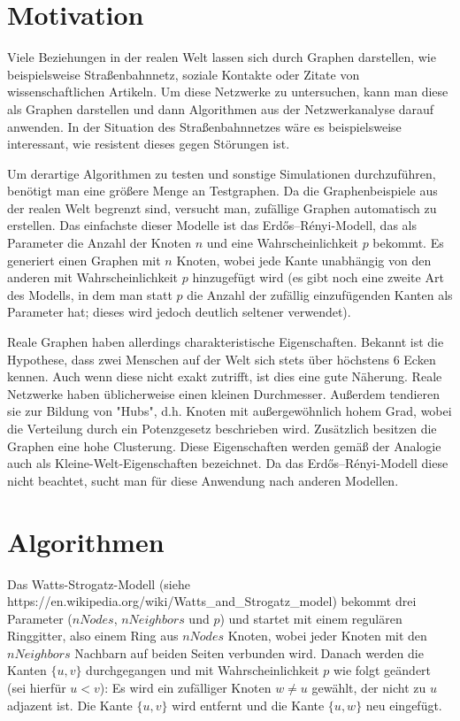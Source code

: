 \documentclass[a4paper]{scrartcl}
\begin{document}
\section{Motivation}
Viele Beziehungen in der realen Welt lassen sich durch Graphen darstellen, wie beispielsweise Straßenbahnnetz, soziale Kontakte oder Zitate von wissenschaftlichen Artikeln. Um diese Netzwerke zu untersuchen, kann man diese als Graphen darstellen und dann Algorithmen aus der Netzwerkanalyse darauf anwenden. In der Situation des Straßenbahnnetzes wäre es beispielsweise interessant, wie resistent dieses gegen Störungen ist.

Um derartige Algorithmen zu testen und sonstige Simulationen durchzuführen, benötigt man eine größere Menge an Testgraphen. Da die Graphenbeispiele aus der realen Welt begrenzt sind, versucht man, zufällige Graphen automatisch zu erstellen. Das einfachste dieser Modelle ist das Erdős–Rényi-Modell, das als Parameter die Anzahl der Knoten $n$ und eine Wahrscheinlichkeit $p$ bekommt. Es generiert einen Graphen mit $n$ Knoten, wobei jede Kante unabhängig von den anderen mit Wahrscheinlichkeit $p$ hinzugefügt wird (es gibt noch eine zweite Art des Modells, in dem man statt $p$ die Anzahl der zufällig einzufügenden Kanten als Parameter hat; dieses wird jedoch deutlich seltener verwendet).

Reale Graphen haben allerdings charakteristische Eigenschaften. Bekannt ist die Hypothese, dass zwei Menschen auf der Welt sich stets über höchstens 6 Ecken kennen. Auch wenn diese nicht exakt zutrifft, ist dies eine gute Näherung. Reale Netzwerke haben üblicherweise einen kleinen Durchmesser. Außerdem tendieren sie zur Bildung von "Hubs", d.h. Knoten mit außergewöhnlich hohem Grad, wobei die Verteilung durch ein Potenzgesetz beschrieben wird. Zusätzlich besitzen die Graphen eine hohe Clusterung. Diese Eigenschaften werden gemäß der Analogie auch als Kleine-Welt-Eigenschaften bezeichnet. Da das Erdős–Rényi-Modell diese nicht beachtet, sucht man für diese Anwendung nach anderen Modellen.

\section{Algorithmen}
Das Watts-Strogatz-Modell (siehe https://en.wikipedia.org/wiki/Watts\_and\_Strogatz\_model) bekommt drei Parameter ($nNodes$, $nNeighbors$ und $p$) und startet mit einem regulären Ringgitter, also einem Ring aus $nNodes$ Knoten, wobei jeder Knoten mit den $nNeighbors$ Nachbarn auf beiden Seiten verbunden wird. Danach werden die Kanten $\{u,v\}$ durchgegangen und mit Wahrscheinlichkeit $p$ wie folgt geändert (sei hierfür $u<v$): Es wird ein zufälliger Knoten $w\neq u$ gewählt, der nicht zu $u$ adjazent ist. Die Kante $\{u,v\}$ wird entfernt und die Kante $\{u,w\}$ neu eingefügt.
\end{document}
